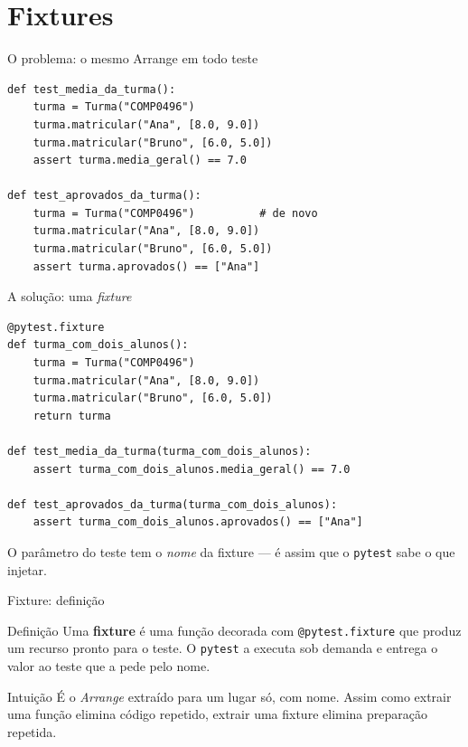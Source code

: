 \documentclass[aspectratio=169]{beamer}
\begin{document}
\section{Fixtures}

\begin{frame}[fragile]{O problema: o mesmo Arrange em todo teste}
\begin{lstlisting}
def test_media_da_turma():
    turma = Turma("COMP0496")
    turma.matricular("Ana", [8.0, 9.0])
    turma.matricular("Bruno", [6.0, 5.0])
    assert turma.media_geral() == 7.0

def test_aprovados_da_turma():
    turma = Turma("COMP0496")          # de novo
    turma.matricular("Ana", [8.0, 9.0])
    turma.matricular("Bruno", [6.0, 5.0])
    assert turma.aprovados() == ["Ana"]
\end{lstlisting}
\end{frame}

\begin{frame}[fragile]{A solução: uma \emph{fixture}}
\begin{lstlisting}
@pytest.fixture
def turma_com_dois_alunos():
    turma = Turma("COMP0496")
    turma.matricular("Ana", [8.0, 9.0])
    turma.matricular("Bruno", [6.0, 5.0])
    return turma

def test_media_da_turma(turma_com_dois_alunos):
    assert turma_com_dois_alunos.media_geral() == 7.0

def test_aprovados_da_turma(turma_com_dois_alunos):
    assert turma_com_dois_alunos.aprovados() == ["Ana"]
\end{lstlisting}
  \small O parâmetro do teste tem o \emph{nome} da fixture --- é assim que
  o \texttt{pytest} sabe o que injetar.
\end{frame}

\begin{frame}{Fixture: definição}
  \begin{block}{Definição}
    Uma \textbf{fixture} é uma função decorada com
    \texttt{@pytest.fixture} que produz um recurso pronto para o teste.
    O \texttt{pytest} a executa sob demanda e entrega o valor ao teste
    que a pede pelo nome.
  \end{block}
  \begin{exampleblock}{Intuição}
    É o \emph{Arrange} extraído para um lugar só, com nome. Assim como
    extrair uma função elimina código repetido, extrair uma fixture
    elimina preparação repetida.
  \end{exampleblock}
\end{frame}
\end{document}
